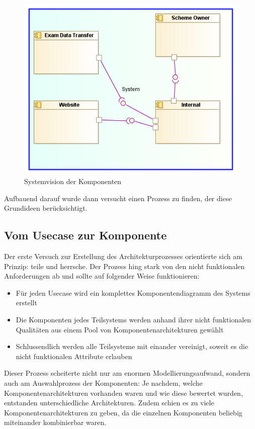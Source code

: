 \begin{figure}[!htbp]
    \centering
    \includegraphics[scale=0.6]{uml/vision.png}
    \caption{Systemvision der Komponenten}
\end{figure}

Aufbauend darauf wurde dann versucht einen Prozess zu finden, der diese Grundideen berücksichtigt.

\subsection{Vom Usecase zur Komponente}
Der erste Versuch zur Erstellung des Architekturprozesses orientierte sich am Prinzip: teile und herrsche. Der Prozess hing stark von den nicht funktionalen Anforderungen ab und sollte auf folgender Weise funktionieren:

\begin{itemize}
  \item Für jeden Usecase wird ein komplettes Komponentendiagramm des Systems erstellt
  \item Die Komponenten jedes Teilsystems werden anhand ihrer nicht funktionalen Qualitäten aus einem Pool von Komponentenarchitekturen gewählt
  \item Schlussendlich werden alle Teilsysteme mit einander vereinigt, soweit es die nicht funktionalen Attribute erlauben
\end{itemize}

Dieser Prozess scheiterte nicht nur am enormen Modellierungsaufwand, sondern auch am Auswahlprozess der Komponenten: Je nachdem, welche Komponentenarchitekturen vorhanden waren und wie diese bewertet wurden, entstanden unterschiedliche Architekturen. Zudem schien es zu viele Komponentenarchitekturen zu geben, da die einzelnen Komponenten beliebig miteinander kombinierbar waren.


